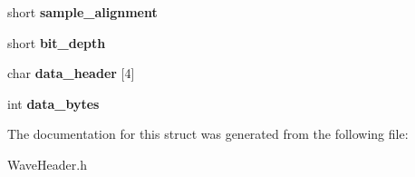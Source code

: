 \begin{DoxyCompactItemize}
short {\bfseries sample\+\_\+alignment}
\item 
\mbox{\label{structwav__header_a63fa60069060bae97c8a64c5b37afa23}} 
short {\bfseries bit\+\_\+depth}
\item 
\mbox{\label{structwav__header_ae43fac12459053e98a80e3879c5cd2a7}} 
char {\bfseries data\+\_\+header} \mbox{[}4\mbox{]}
\item 
\mbox{\label{structwav__header_a3eeeca270947eab7c7aaee61bbee9b0e}} 
int {\bfseries data\+\_\+bytes}
\end{DoxyCompactItemize}


The documentation for this struct was generated from the following file\+:\begin{DoxyCompactItemize}
\item 
Wave\+Header.\+h\end{DoxyCompactItemize}

